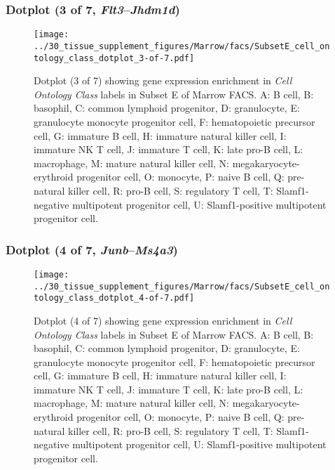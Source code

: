 \subsubsection{Dotplot (3 of 7, \emph{Flt3}--\emph{Jhdm1d})}
\begin{figure}[h]
\centering
\texttt{[image: ../30\_tissue\_supplement\_figures/Marrow/facs/SubsetE\_cell\_ontology\_class\_dotplot\_3-of-7.pdf]}

\caption{ Dotplot (3 of 7)  showing gene expression enrichment in \emph{Cell Ontology Class} labels in Subset E of Marrow FACS. A: B cell, B: basophil, C: common lymphoid progenitor, D: granulocyte, E: granulocyte monocyte progenitor cell, F: hematopoietic precursor cell, G: immature B cell, H: immature natural killer cell, I: immature NK T cell, J: immature T cell, K: late pro-B cell, L: macrophage, M: mature natural killer cell, N: megakaryocyte-erythroid progenitor cell, O: monocyte, P: naive B cell, Q: pre-natural killer cell, R: pro-B cell, S: regulatory T cell, T: Slamf1-negative multipotent progenitor cell, U: Slamf1-positive multipotent progenitor cell.}
\end{figure}


\clearpage

\subsubsection{Dotplot (4 of 7, \emph{Junb}--\emph{Ms4a3})}
\begin{figure}[h]
\centering
\texttt{[image: ../30\_tissue\_supplement\_figures/Marrow/facs/SubsetE\_cell\_ontology\_class\_dotplot\_4-of-7.pdf]}

\caption{ Dotplot (4 of 7)  showing gene expression enrichment in \emph{Cell Ontology Class} labels in Subset E of Marrow FACS. A: B cell, B: basophil, C: common lymphoid progenitor, D: granulocyte, E: granulocyte monocyte progenitor cell, F: hematopoietic precursor cell, G: immature B cell, H: immature natural killer cell, I: immature NK T cell, J: immature T cell, K: late pro-B cell, L: macrophage, M: mature natural killer cell, N: megakaryocyte-erythroid progenitor cell, O: monocyte, P: naive B cell, Q: pre-natural killer cell, R: pro-B cell, S: regulatory T cell, T: Slamf1-negative multipotent progenitor cell, U: Slamf1-positive multipotent progenitor cell.}
\end{figure}


\clearpage

